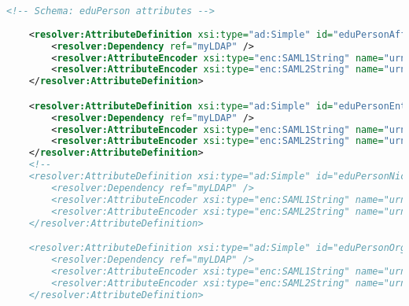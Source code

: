 \begin{lstlisting}[language=xml]
    <!-- Schema: eduPerson attributes -->
    
    <resolver:AttributeDefinition xsi:type="ad:Simple" id="eduPersonAffiliation" sourceAttributeID="eduPersonAffiliation">
        <resolver:Dependency ref="myLDAP" />
        <resolver:AttributeEncoder xsi:type="enc:SAML1String" name="urn:mace:dir:attribute-def:eduPersonAffiliation" />
        <resolver:AttributeEncoder xsi:type="enc:SAML2String" name="urn:oid:1.3.6.1.4.1.5923.1.1.1.1" friendlyName="eduPersonAffiliation" />
    </resolver:AttributeDefinition>

    <resolver:AttributeDefinition xsi:type="ad:Simple" id="eduPersonEntitlement" sourceAttributeID="eduPersonEntitlement">
        <resolver:Dependency ref="myLDAP" />
        <resolver:AttributeEncoder xsi:type="enc:SAML1String" name="urn:mace:dir:attribute-def:eduPersonEntitlement" />
        <resolver:AttributeEncoder xsi:type="enc:SAML2String" name="urn:oid:1.3.6.1.4.1.5923.1.1.1.7" friendlyName="eduPersonEntitlement" />
    </resolver:AttributeDefinition>
    <!--
    <resolver:AttributeDefinition xsi:type="ad:Simple" id="eduPersonNickname" sourceAttributeID="eduPersonNickname">
        <resolver:Dependency ref="myLDAP" />
        <resolver:AttributeEncoder xsi:type="enc:SAML1String" name="urn:mace:dir:attribute-def:eduPersonNickname" />
        <resolver:AttributeEncoder xsi:type="enc:SAML2String" name="urn:oid:1.3.6.1.4.1.5923.1.1.1.2" friendlyName="eduPersonNickname" />
    </resolver:AttributeDefinition>

    <resolver:AttributeDefinition xsi:type="ad:Simple" id="eduPersonOrgDN" sourceAttributeID="eduPersonOrgDN">
        <resolver:Dependency ref="myLDAP" />
        <resolver:AttributeEncoder xsi:type="enc:SAML1String" name="urn:mace:dir:attribute-def:eduPersonOrgDN" />
        <resolver:AttributeEncoder xsi:type="enc:SAML2String" name="urn:oid:1.3.6.1.4.1.5923.1.1.1.3" friendlyName="eduPersonOrgDN" />
    </resolver:AttributeDefinition>


\end{lstlisting}

